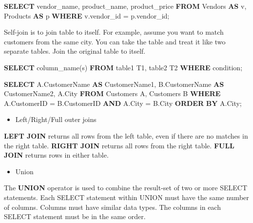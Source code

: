 \documentclass[]{book}
\newenvironment{Shaded}{\begin{snugshade}}{\end{snugshade}}
\newcommand{\KeywordTok}[1]{\textcolor[rgb]{0.13,0.29,0.53}{\textbf{{#1}}}}
\newcommand{\NormalTok}[1]{{#1}}
\providecommand{\tightlist}{%
  \setlength{\itemsep}{0pt}\setlength{\parskip}{0pt}}
\theoremstyle{definition}
\theoremstyle{definition}
\theoremstyle{remark}
\begin{document}
\begin{Shaded}
\begin{Highlighting}[]
\KeywordTok{SELECT} \NormalTok{vendor_name, product_name, product_price}
\KeywordTok{FROM} \NormalTok{Vendors }\KeywordTok{AS} \NormalTok{v, Products }\KeywordTok{AS} \NormalTok{p}
\KeywordTok{WHERE} \NormalTok{v.vendor_id = p.vendor_id;}
\end{Highlighting}
\end{Shaded}

Self-join is to join table to itself. For example, assume you want to
match customers from the same city. You can take the table and treat it
like two separate tables. Join the original table to itself.

\begin{Shaded}
\begin{Highlighting}[]
\KeywordTok{SELECT} \NormalTok{column_name(s)}
\KeywordTok{FROM} \NormalTok{table1 T1, table2 T2 }
\KeywordTok{WHERE} \NormalTok{condition;}
\end{Highlighting}
\end{Shaded}

\begin{Shaded}
\begin{Highlighting}[]
\KeywordTok{SELECT} \NormalTok{A.CustomerName }\KeywordTok{AS} \NormalTok{CustomerName1, B.CustomerName }\KeywordTok{AS} \NormalTok{CustomerName2, A.City}
\KeywordTok{FROM} \NormalTok{Customers A, Customers B}
\KeywordTok{WHERE} \NormalTok{A.CustomerID = B.CustomerID}
\KeywordTok{AND} \NormalTok{A.City = B.City}
\KeywordTok{ORDER} \KeywordTok{BY} \NormalTok{A.City;}
\end{Highlighting}
\end{Shaded}

\begin{itemize}
\tightlist
\item
  Left/Right/Full outer joins
\end{itemize}

\textbf{LEFT JOIN} returns all rows from the left table, even if there
are no matches in the right table. \textbf{RIGHT JOIN} returns all rows
from the right table. \textbf{FULL JOIN} returns rows in either table.

\begin{itemize}
\tightlist
\item
  Union
\end{itemize}

The \textbf{UNION} operator is used to combine the result-set of two or
more SELECT statements. Each SELECT statement within UNION must have the
same number of columns. Columns must have similar data types. The
columns in each SELECT statement must be in the same order.
\end{document}
